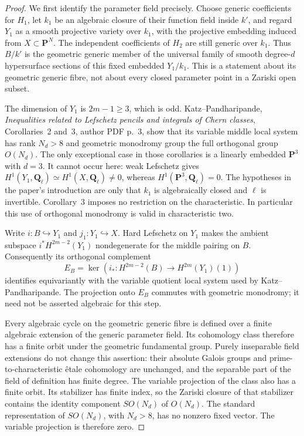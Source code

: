 \documentclass[11pt,a4paper]{article}
\begin{document}
\begin{proof}
We first identify the parameter field precisely. Choose generic
coefficients for $H_1$, let $k_1$ be an algebraic closure of their
function field inside $k'$, and regard $Y_1$ as a smooth projective
variety over $k_1$, with the projective embedding induced from
$X\subset\mathbf P^N$. The independent coefficients of $H_2$ are
still generic over $k_1$. Thus $B/k'$ is the geometric generic member
of the universal family of smooth degree-$d$ hypersurface sections
of this fixed embedded $Y_1/k_1$. This is a statement about its
geometric generic fibre, not about every closed parameter point in
a Zariski open subset.

The dimension of $Y_1$ is $2m-1\ge3$, which is odd.
Katz--Pandharipande, \emph{Inequalities related to Lefschetz pencils
and integrals of Chern classes}, Corollaries~2 and~3, author PDF
p.~3, show that its variable middle local system has rank $N_d>8$
and geometric monodromy group the full orthogonal group $O(N_d)$.
The only exceptional case in those corollaries is a linearly
embedded $\mathbf P^3$ with $d=3$. It cannot occur here:
weak Lefschetz gives
$H^1(Y_1,\mathbf Q_\ell)\simeq H^1(X,\mathbf Q_\ell)\ne0$,
whereas $H^1(\mathbf P^3,\mathbf Q_\ell)=0$.
The hypotheses in the paper's introduction are only that $k_1$ is
algebraically closed and $\ell$ is invertible. Corollary~3 imposes
no restriction on the characteristic. In particular this use of
orthogonal monodromy is valid in characteristic two.

Write $i:B\hookrightarrow Y_1$ and $j_1:Y_1\hookrightarrow X$.
Hard Lefschetz on $Y_1$ makes the ambient subspace
$i^*H^{2m-2}(Y_1)$ nondegenerate for the middle pairing on $B$.
Consequently its orthogonal complement
\[
 E_B=\ker\!\left(i_*:H^{2m-2}(B)
                         \longrightarrow H^{2m}(Y_1)(1)\right)
\]
identifies equivariantly with the variable quotient local system
used by Katz--Pandharipande. The projection onto $E_B$ commutes with
geometric monodromy; it need not be asserted algebraic for this step.

Every algebraic cycle on the geometric generic fibre is defined
over a finite algebraic extension of the generic parameter field.
Its cohomology class therefore has a finite orbit under the
geometric fundamental group. Purely inseparable field extensions
do not change this assertion: their absolute Galois groups and
prime-to-characteristic \^{e}tale cohomology are unchanged, and the
separable part of the field of definition has finite degree.
The variable projection of the class also has a finite orbit.
Its stabilizer has finite index, so the Zariski closure of that
stabilizer contains the identity component $SO(N_d)$ of $O(N_d)$.
The standard representation of $SO(N_d)$, with $N_d>8$, has no
nonzero fixed vector. The variable projection is therefore zero.


\end{proof}
\end{document}
